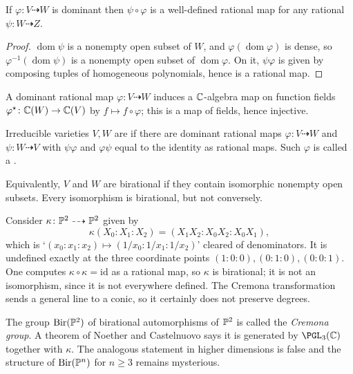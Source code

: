 \documentclass[a4paper]{scrartcl}
\newcommand{\dto}{\dashrightarrow}
\DeclareMathOperator{\Bir}{Bir}
\DeclareMathOperator{\dom}{dom}
\begin{document}
\begin{proposition}
	If $\varphi \colon V \dto W$ is dominant then $\psi \circ \varphi$ is a well-defined rational map for any rational $\psi \colon W \dto Z$.
\end{proposition}

\begin{proof}
	$\dom\psi$ is a nonempty open subset of $W$, and $\varphi(\dom\varphi)$ is dense, so $\varphi^{-1}(\dom\psi)$ is a nonempty open subset of $\dom\varphi$. On it, $\psi\varphi$ is given by composing tuples of homogeneous polynomials, hence is a rational map.
\end{proof}

A dominant rational map $\varphi \colon V \dto W$ induces a $\mathbb{C}$-algebra map on function fields $\varphi^\star \colon \mathbb{C}(W) \to \mathbb{C}(V)$ by $f \mapsto f \circ \varphi$; this is a map of fields, hence injective.

\begin{definition}[Birational]
	Irreducible varieties $V, W$ are  if there are dominant rational maps $\varphi \colon V \dto W$ and $\psi \colon W \dto V$ with $\psi\varphi$ and $\varphi\psi$ equal to the identity as rational maps. Such $\varphi$ is called a .
\end{definition}

Equivalently, $V$ and $W$ are birational if they contain isomorphic nonempty open subsets. Every isomorphism is birational, but not conversely.

\begin{example}
	Consider $\kappa \colon \PP^2 \dto \PP^2$ given by
	$$\kappa(X_0:X_1:X_2) = (X_1X_2 : X_0X_2 : X_0X_1),$$
	which is `$(x_0:x_1:x_2) \mapsto (1/x_0 : 1/x_1 : 1/x_2)$' cleared of denominators. It is undefined exactly at the three coordinate points $(1:0:0), (0:1:0), (0:0:1)$. One computes $\kappa \circ \kappa = \mathrm{id}$ as a rational map, so $\kappa$ is birational; it is not an isomorphism, since it is not everywhere defined. The Cremona transformation sends a general line to a conic, so it certainly does not preserve degrees.
\end{example}

\begin{remark}
	The group $\Bir(\PP^2)$ of birational automorphisms of $\mathbb{P}^2$ is called the \emph{Cremona group}. A theorem of Noether and Castelnuovo says it is generated by $\PGL_3(\C)$ together with $\kappa$. The analogous statement in higher dimensions is false and the structure of $\Bir(\PP^n)$ for $n \geq 3$ remains mysterious.
\end{remark}
\end{document}
